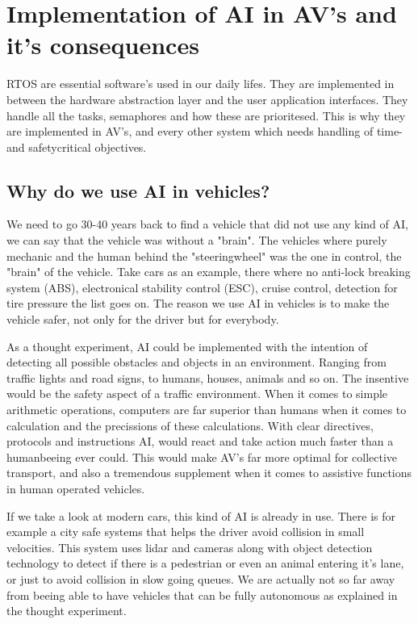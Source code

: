 \documentclass[conference]{IEEEtran}
\begin{document}
\section{Implementation of AI in AV's and it's consequences}
RTOS are essential software's used in our daily lifes. They are implemented in between the 
hardware abstraction layer and the user application interfaces. They handle all the tasks, semaphores and
how these are prioritesed. This is why they are implemented in AV's, and every other system which needs handling
of time- and safetycritical objectives.

 \subsection{Why do we use AI in vehicles?}
	We need to go 30-40 years back to find a vehicle that did not use any kind of AI, we can say that the vehicle was without a "brain". 
	The vehicles where purely mechanic and the human behind the "steeringwheel" was the one in control, the "brain" of the vehicle. 
	Take cars as an example, there where no anti-lock breaking system (ABS), electronical stability control (ESC), cruise control, detection for tire pressure
	the list goes on. The reason we use AI in vehicles is to make the vehicle safer, not only for the driver but for everybody. %

	As a thought experiment, AI could be implemented with the intention of detecting all possible 
	obstacles and objects in an environment. Ranging from traffic lights and road signs, to humans,
	houses, animals and so on. The insentive would be the safety aspect of a traffic environment. 
	When it comes to simple arithmetic operations, computers are far superior than humans when it comes 
	to calculation and the precissions of these calculations. With clear directives, protocols and instructions
	AI, would react and take action much faster than a humanbeeing ever could. This would make 
	AV's far more optimal for collective transport, and also a tremendous supplement when it comes to 
	assistive functions in human operated vehicles.

	If we take a look at modern cars, this kind of AI is already in use. There is for example a city safe systems that 
	helps the driver avoid collision in small velocities. This system uses lidar and cameras along with object detection technology 
	to detect if there is a pedestrian or even an animal entering it's lane, or just to avoid collision in slow going queues. 
	We are actually not so far away from beeing able to have vehicles that can be fully autonomous as explained in the thought experiment. 
\end{document}
